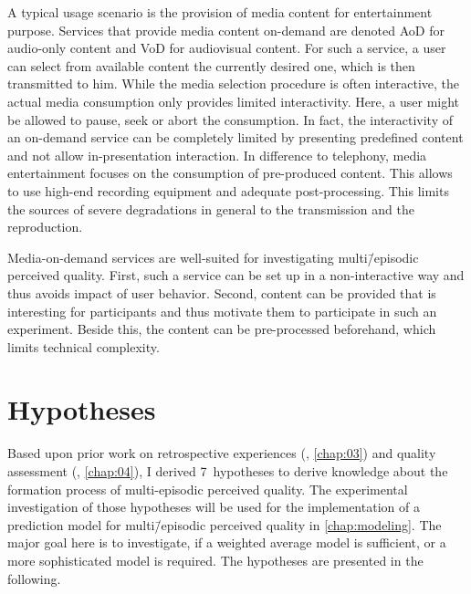A typical usage scenario is the provision of media content for entertainment purpose.
Services that provide media content on-demand are denoted \acf{AoD} for audio-only content and \acf{VoD} for audiovisual content.
For such a service, a user can select from available content the currently desired one, which is then transmitted to him.
While the media selection procedure is often interactive, the actual media consumption only provides limited interactivity.
Here, a user might be allowed to pause, seek or abort the consumption.
In fact, the interactivity of an on-demand service can be completely limited by presenting predefined content and not allow in-presentation interaction.
In difference to telephony, media entertainment focuses on the consumption of pre-produced content.
This allows to use high-end recording equipment and adequate post-processing. %
This limits the sources of severe degradations in general to the transmission and the reproduction.

Media-on-demand services are well-suited for investigating multi\=/episodic perceived quality.
First, such a service can be set up in a non-interactive way and thus avoids impact of user behavior.
Second, content can be provided that is interesting for participants and thus motivate them to participate in such an experiment.
Beside this, the content can be pre-processed beforehand, which limits technical complexity.

\section{Hypotheses}
Based upon prior work on retrospective experiences (\cf, \autoref{chap:03}) and quality assessment (\cf, \autoref{chap:04}), I derived 7~hypotheses to derive knowledge about the formation process of multi-episodic perceived quality.
The experimental investigation of those hypotheses will be used for the implementation of a prediction model for multi\=/episodic perceived quality in \autoref{chap:modeling}.
The major goal here is to investigate, if a weighted average model is sufficient, or a more sophisticated model is required.
The hypotheses are presented in the following.

